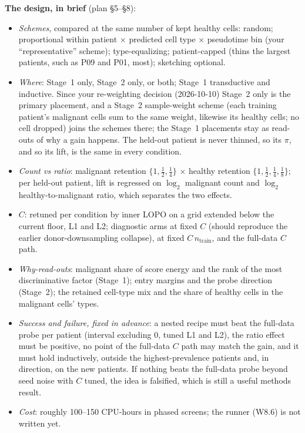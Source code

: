 \textbf{The design, in brief} (plan \S5--\S8):
\begin{itemize}[leftmargin=1.4em]
\item \emph{Schemes}, compared at the same number of kept healthy cells: random; proportional within patient $\times$ predicted cell type $\times$ pseudotime bin (your ``representative'' scheme); type-equalizing; patient-capped (thins the largest patients, such as P09 and P01, most); sketching optional.
\item \emph{Where}: Stage~1 only, Stage~2 only, or both; Stage~1 transductive and inductive. Since your re-weighting decision (2026-10-10) Stage~2 only is the primary placement, and a Stage~2 sample-weight scheme (each training patient's malignant cells sum to the same weight, likewise its healthy cells; no cell dropped) joins the schemes there; the Stage~1 placements stay as read-outs of why a gain happens. The held-out patient is never thinned, so its $\pi$, and so its lift, is the same in every condition.
\item \emph{Count vs ratio}: malignant retention $\{1, \tfrac12, \tfrac14\}$ $\times$ healthy retention $\{1, \tfrac12, \tfrac14, \tfrac18\}$; per held-out patient, lift is regressed on $\log_2$ malignant count and $\log_2$ healthy-to-malignant ratio, which separates the two effects.
\item \emph{$C$}: retuned per condition by inner LOPO on a grid extended below the current floor, L1 and L2; diagnostic arms at fixed $C$ (should reproduce the earlier donor-downsampling collapse), at fixed $C\,n_{\text{train}}$, and the full-data $C$ path.
\item \emph{Why-read-outs}: malignant share of score energy and the rank of the most discriminative factor (Stage~1); entry margins and the probe direction (Stage~2); the retained cell-type mix and the share of healthy cells in the malignant cells' types.
\item \emph{Success and failure, fixed in advance}: a nested recipe must beat the full-data probe per patient (interval excluding 0, tuned L1 and L2), the ratio effect must be positive, no point of the full-data $C$ path may match the gain, and it must hold inductively, outside the highest-prevalence patients and, in direction, on the new patients. If nothing beats the full-data probe beyond seed noise with $C$ tuned, the idea is falsified, which is still a useful methods result.
\item \emph{Cost}: roughly 100--150 CPU-hours in phased screens; the runner (W8.6) is not written yet.
\end{itemize}

